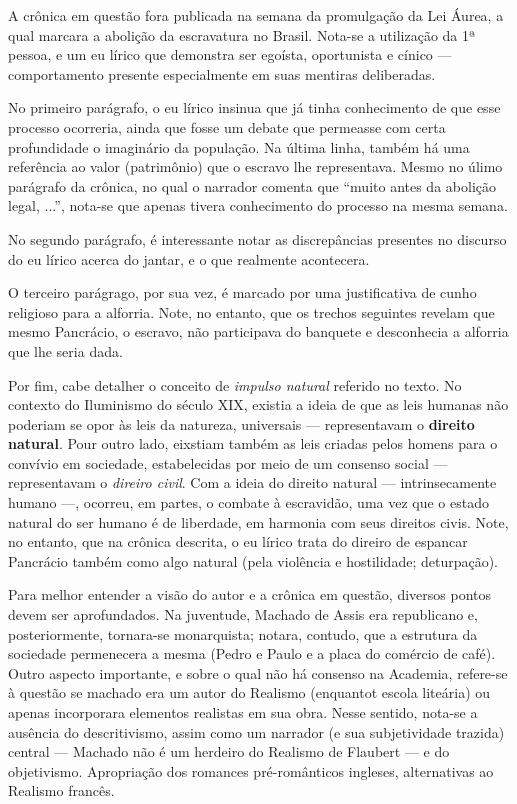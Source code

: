 A crônica em questão fora publicada na semana da promulgação da Lei Áurea, a qual marcara a abolição da escravatura no Brasil. Nota-se a utilização da 1ª pessoa, e um eu lírico que demonstra ser egoísta, oportunista e cínico — comportamento presente especialmente em suas mentiras deliberadas.

No primeiro parágrafo, o eu lírico insinua que já tinha conhecimento de que esse processo ocorreria, ainda que fosse um debate que permeasse com certa profundidade o imaginário da população. Na última linha, também há uma referência ao valor (patrimônio) que o escravo lhe representava. Mesmo no úlimo parágrafo da crônica, no qual o narrador comenta que ``muito antes da abolição legal, ...'', nota-se que apenas tivera conhecimento do processo na mesma semana.

No segundo parágrafo, é interessante notar as discrepâncias presentes no discurso do eu lírico acerca do jantar, e o que realmente acontecera.

O terceiro parágrago, por sua vez, é marcado por uma justificativa de cunho religioso para a alforria. Note, no entanto, que os trechos seguintes revelam que mesmo Pancrácio, o escravo, não participava do banquete e desconhecia a alforria que lhe seria dada.

Por fim, cabe detalher o conceito de \textit{impulso natural} referido no texto. No contexto do Iluminismo do século XIX, existia a ideia de que as leis humanas não poderiam se opor às leis da natureza, universais — representavam o \textbf{direito natural}. Pour outro lado, eixstiam também as leis criadas pelos homens para o convívio em sociedade, estabelecidas por meio de um consenso social — representavam o \textit{direiro civil}. Com a ideia do direito natural — intrinsecamente humano —, ocorreu, em partes, o combate à escravidão, uma vez que o estado natural do ser humano é de liberdade, em harmonia com seus direitos civis. Note, no entanto, que na crônica descrita, o eu lírico trata do direiro de espancar Pancrácio também como algo natural (pela violência e hostilidade; deturpação).

Para melhor entender a visão do autor e a crônica em questão, diversos pontos devem ser aprofundados. Na juventude, Machado de Assis era republicano e, posteriormente, tornara-se monarquista; notara, contudo, que a estrutura da sociedade permenecera a mesma (Pedro e Paulo e a placa do comércio de café). Outro aspecto importante, e sobre o qual não há consenso na Academia, refere-se à questão se machado era um autor do Realismo (enquantot escola liteária) ou apenas incorporara elementos realistas em sua obra. Nesse sentido, nota-se a ausência do descritivismo, assim como um narrador (e sua subjetividade trazida) central — Machado não é um herdeiro do Realismo de Flaubert — e do objetivismo. Apropriação dos romances pré-românticos ingleses, alternativas ao Realismo francês.

